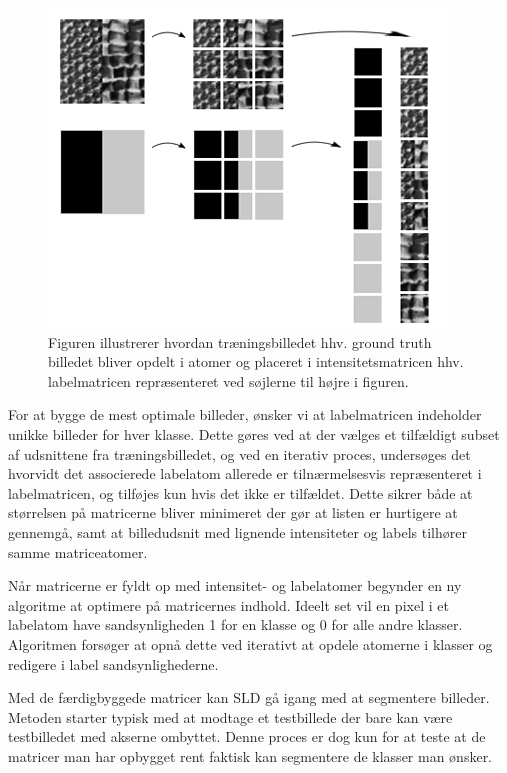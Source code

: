 \begin{figure}[H]
		\includegraphics[scale=1]{files/postmethod/img/dict_new1.png}
	\caption{Figuren illustrerer hvordan træningsbilledet hhv. ground truth billedet bliver opdelt i atomer og placeret i intensitetsmatricen hhv. labelmatricen repræsenteret ved søjlerne til højre i figuren. \label{fig:postmethod_intensitydict_init}}
\end{figure}

For at bygge de mest optimale billeder, ønsker vi at labelmatricen indeholder unikke billeder for hver klasse. Dette gøres ved at der vælges et tilfældigt subset af udsnittene fra træningsbilledet, og ved en iterativ proces, undersøges det hvorvidt det associerede labelatom allerede er tilnærmelsesvis repræsenteret i labelmatricen, og tilføjes kun hvis det ikke er tilfældet. Dette sikrer både at størrelsen på matricerne bliver minimeret der gør at listen er hurtigere at gennemgå, samt at billedudsnit med lignende intensiteter og labels tilhører samme matriceatomer. 

Når matricerne er fyldt op med intensitet- og labelatomer begynder en ny algoritme at optimere på matricernes indhold. Ideelt set vil en pixel i et labelatom have sandsynligheden 1 for en klasse og 0 for alle andre klasser. Algoritmen forsøger at opnå dette ved iterativt at opdele atomerne i klasser og redigere i label sandsynlighederne. 

Med de færdigbyggede matricer kan SLD gå igang med at segmentere billeder. Metoden starter typisk med at modtage et testbillede der bare kan være testbilledet med akserne ombyttet. Denne proces er dog kun for at teste at de matricer man har opbygget rent faktisk kan segmentere de klasser man ønsker.

